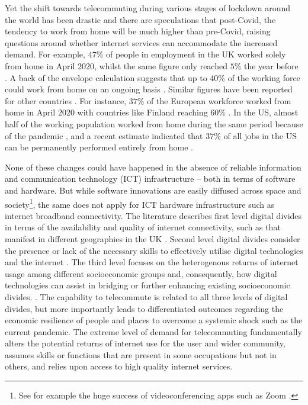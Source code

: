 \documentclass[,]{sagej}
\begin{document}
Yet the shift towards telecommuting during various stages of lockdown
around the world has been drastic and there are speculations that
post-Covid, the tendency to work from home will be much higher than
pre-Covid, raising questions around whether internet services can
accommodate the increased demand. For example, \(47\)\% of people in
employment in the UK worked solely from home in April \(2020\), whilst
the same figure only reached \(5\)\% the year before
\citep{ons2020, ons2020lm2019}. A back of the envelope calculation
suggests that up to 40\% of the working force could work from home on an
ongoing basis \citep{batty2020editorial}. Similar figures have been
reported for other countries \citep{felstead2020homeworking}. For
instance, \(37\)\% of the European workforce worked from home in April
\(2020\) with countries like Finland reaching \(60\)\%
\citep{eurofound2020}. In the US, almost half of the working population
worked from home during the same period because of the pandemic
\citep{brynjolfsson2020covid}, and a recent estimate indicated that
\(37\)\% of all jobs in the US can be permanently performed entirely
from home \citep{NBERw26948}.

None of these changes could have happened in the absence of reliable
information and communication technology (ICT) infrastructure -- both in
terms of software and hardware. But while software innovations are
easily diffused across space and society\footnote{See for example the
  huge success of videoconferencing apps such as Zoom
  \citep{marks2020zoom}.}, the same does not apply for ICT hardware
infrastructure such as internet broadband connectivity. The literature
describes first level digital divides in terms of the availability and
quality of internet connectivity, such as that manifest in different
geographies in the UK
\citep{riddlesden2014broadband, philip2017digital}. Second level digital
divides consider the presence or lack of the necessary skills to
effectively utilise digital technologies and the internet
\citep{blank2014dimensions, van2011internet}. The third level focuses on
the heterogenous returns of internet usage among different socioeconomic
groups and, consequently, how digital technologies can assist in
bridging or further enhancing existing socioeconomic divides.
\citep{stern2009levels, van2014digital, van2015third}. The capability to
telecommute is related to all three levels of digital divides, but more
importantly leads to differentiated outcomes regarding the economic
resilience of people and places to overcome a systemic shock such as the
current pandemic. The extreme level of demand for telecommuting
fundamentally alters the potential returns of internet use for the user
and wider community, assumes skills or functions that are present in
some occupations but not in others, and relies upon access to high
quality internet services.
\end{document}
